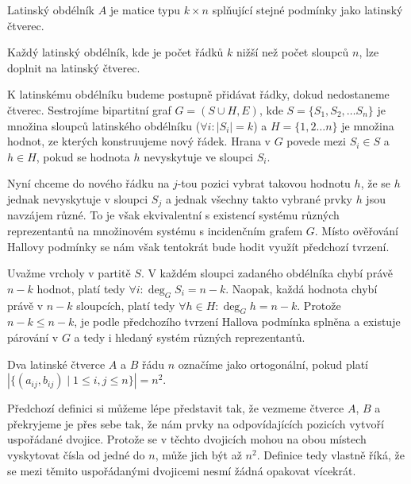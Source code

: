\begin{t_definition}
  Latinský obdélník $A$ je matice typu $k \times n$ splňující stejné podmínky jako latinský čtverec.
\end{t_definition}

\begin{t_claim}
  Každý latinský obdélník, kde je počet řádků $k$ nižší než počet sloupců $n$, lze doplnit na latinský čtverec.
\end{t_claim}

\begin{t_proof}
  K latinskému obdélníku budeme postupně přidávat řádky, dokud nedostaneme čtverec. Sestrojíme bipartitní graf $G=(S\cup H, E)$, kde $S=\{S_1, S_2, \dots S_n\}$ je množina sloupců latinského obdélníku ($\forall i:|S_i|=k$) a $H=\{1,2\dots n\}$ je množina hodnot, ze kterých konstruujeme nový řádek. Hrana v $G$ povede mezi $S_i\in S$ a $h\in H$, pokud se hodnota $h$ nevyskytuje ve sloupci $S_i$.
  
  Nyní chceme do nového řádku na $j$-tou pozici vybrat takovou hodnotu $h$, že se $h$ jednak nevyskytuje v sloupci $S_j$ a jednak všechny takto vybrané prvky $h$ jsou navzájem různé. To je však ekvivalentní s existencí systému různých reprezentantů na množinovém systému s incidenčním grafem $G$. Místo ověřování Hallovy podmínky se nám však tentokrát bude hodit využít předchozí tvrzení.
  
  Uvažme vrcholy v partitě $S$. V každém sloupci zadaného obdélníka chybí právě $n-k$ hodnot, platí tedy $\forall i:\deg_G S_i=n-k$. Naopak, každá hodnota chybí právě v $n-k$ sloupcích, platí tedy $\forall h\in H:\deg_G h=n-k$. Protože $n-k\leq n-k$, je podle předchozího tvrzení Hallova podmínka splněna a existuje párování v $G$ a tedy i hledaný systém různých reprezentantů.
\end{t_proof}

\begin{t_definition}
  Dva latinské čtverce $A$ a $B$ řádu $n$ označíme jako ortogonální, pokud platí
  $|\{(a_{ij},b_{ij})\mid 1\leq i,j \leq n\}|=n^2$.
\end{t_definition}

\begin{t_remark}
  Předchozí definici si můžeme lépe představit tak, že vezmeme čtverce $A$, $B$ a překryjeme je přes sebe tak, že nám prvky na odpovídajících pozicích vytvoří uspořádané dvojice. Protože se v těchto dvojicích mohou na obou místech vyskytovat čísla od jedné do $n$, může jich být až $n^2$. Definice tedy vlastně říká, že se mezi těmito uspořádanými dvojicemi nesmí žádná opakovat vícekrát.
\end{t_remark}

